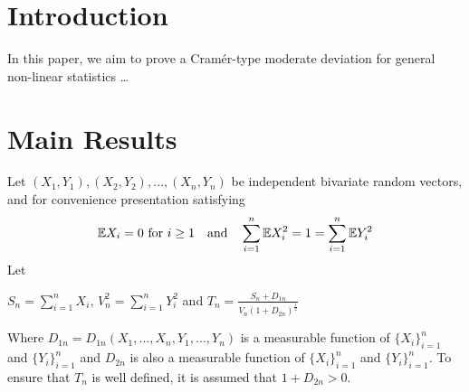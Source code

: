 \documentclass[bj,authoryear]{imsart}
\numberwithin{equation}{section}
\theoremstyle{plain}
\theoremstyle{definition}
\begin{document}
\section{Introduction}
In this paper, we aim to prove a Cram\'{e}r-type moderate deviation for general non-linear statistics \dots

\section{Main Results}
Let $(X_1,Y_1),(X_2,Y_2),\dots,(X_n,Y_n)$ be independent bivariate random vectors, and for convenience presentation satisfying
\begin{align}
    \mathbb{E} X_i = 0\   \text{for}\  i\geq 1 \quad \text{and} \quad  \sum_{i=1}^{n}\mathbb{E} X_{i}^{2} = 1 = \sum_{i=1}^{n}\mathbb{E} Y_{i}^{2}\notag
\end{align}
Let
\begin{center}
    $S_n = \sum_{i=1}^{n}X_i$, $V_{n}^{2} = \sum_{i=1}^{n}Y_{i}^{2}$ and $T_n = \frac{S_n+D_{1n}}{V_n(1+D_{2n})^{\frac{1}{2}}}$
\end{center}
Where  $D_{1n} = D_{1n}(X_1,\dots,X_n,Y_1,\dots,Y_n)$ is a measurable function of $\{X_i\}_{i=1}^{n}$ and $\{Y_i\}_{i=1}^{n}$ and $D_{2n}$ is also a measurable function of $\{X_i\}_{i=1}^{n}$ and $\{Y_i\}_{i=1}^{n}$. To ensure that $T_n$ is well defined, it is assumed that $1+D_{2n}>0$.
\end{document}
